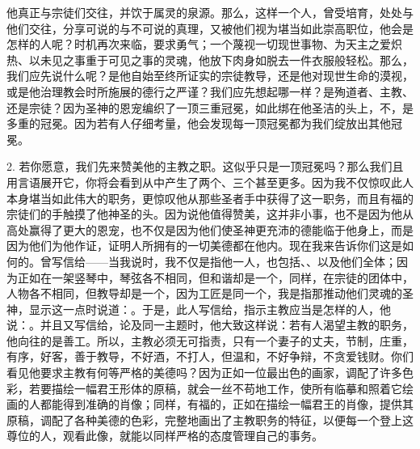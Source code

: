 他真正与宗徒们交往，并饮于属灵的泉源。那么，这样一个人，曾受培育，处处与他们交往，分享可说的与不可说的真理，又被他们视为堪当如此崇高职位，他会是怎样的人呢？时机再次来临，要求勇气；一个蔑视一切现世事物、为天主之爱炽热、以未见之事重于可见之事的灵魂，他放下肉身如脱去一件衣服般轻松。那么，我们应先说什么呢？是他自始至终所证实的宗徒教导，还是他对现世生命的漠视，或是他治理教会时所施展的德行之严谨？我们应先想起哪一样？是殉道者、主教、还是宗徒？因为圣神的恩宠编织了一顶三重冠冕，如此绑在他圣洁的头上，不，是多重的冠冕。因为若有人仔细考量，他会发现每一顶冠冕都为我们绽放出其他冠冕。\par

2. 若你愿意，我们先来赞美他的主教之职。这似乎只是一顶冠冕吗？那么我们且用言语展开它，你将会看到从中产生了两个、三个甚至更多。因为我不仅惊叹此人本身堪当如此伟大的职务，更惊叹他从那些圣者手中获得了这一职务，而且有福的宗徒们的手触摸了他神圣的头。因为说他值得赞美，这并非小事，也不是因为他从高处赢得了更大的恩宠，也不仅是因为他们使圣神更充沛的德能临于他身上，而是因为他们为他作证，证明人所拥有的一切美德都在他内。现在我来告诉你们这是如何的。曾写信给——当我说时，我不仅是指他一人，也包括、、以及他们全体；因为正如在一架竖琴中，琴弦各不相同，但和谐却是一个，同样，在宗徒的团体中，人物各不相同，但教导却是一个，因为工匠是同一个，我是指那推动他们灵魂的圣神，显示这一点时说道：。于是，此人写信给，指示主教应当是怎样的人，他说：。并且又写信给，论及同一主题时，他大致这样说：若有人渴望主教的职务，他向往的是善工。所以，主教必须无可指责，只有一个妻子的丈夫，节制，庄重，有序，好客，善于教导，不好酒，不打人，但温和，不好争辩，不贪爱钱财。你们看见他要求主教有何等严格的美德吗？因为正如一位最出色的画家，调配了许多色彩，若要描绘一幅君王形体的原稿，就会一丝不苟地工作，使所有临摹和照着它绘画的人都能得到准确的肖像；同样，有福的，正如在描绘一幅君王的肖像，提供其原稿，调配了各种美德的色彩，完整地画出了主教职务的特征，以便每一个登上这尊位的人，观看此像，就能以同样严格的态度管理自己的事务。\par


